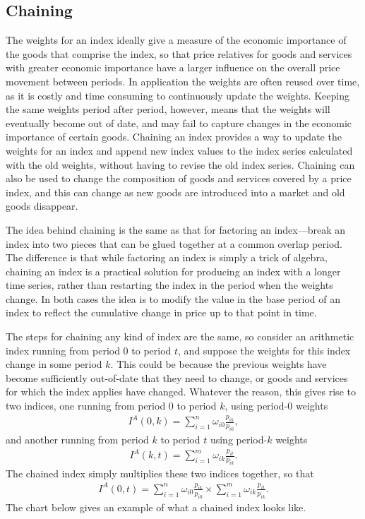 \documentclass[
]{article}
\begin{document}
\hypertarget{chaining}{%
\subsection{Chaining}\label{chaining}}

The weights for an index ideally give a measure of the economic importance of the goods that comprise the index, so that price relatives for goods and services with greater economic importance have a larger influence on the overall price movement between periods. In application the weights are often reused over time, as it is costly and time consuming to continuously update the weights. Keeping the same weights period after period, however, means that the weights will eventually become out of date, and may fail to capture changes in the economic importance of certain goods. Chaining an index provides a way to update the weights for an index and append new index values to the index series calculated with the old weights, without having to revise the old index series. Chaining can also be used to change the composition of goods and services covered by a price index, and this can change as new goods are introduced into a market and old goods disappear.

The idea behind chaining is the same as that for factoring an index---break an index into two pieces that can be glued together at a common overlap period. The difference is that while factoring an index is simply a trick of algebra, chaining an index is a practical solution for producing an index with a longer time series, rather than restarting the index in the period when the weights change. In both cases the idea is to modify the value in the base period of an index to reflect the cumulative change in price up to that point in time.

The steps for chaining any kind of index are the same, so consider an arithmetic index running from period 0 to period \(t\), and suppose the weights for this index change in some period \(k\). This could be because the previous weights have become sufficiently out-of-date that they need to change, or goods and services for which the index applies have changed. Whatever the reason, this gives rise to two indices, one running from period 0 to period \(k\), using period-0 weights
\begin{align*}
I^{A}(0, k) = \sum_{i = 1}^{n} \omega_{i0} \frac{p_{ik}}{p_{i0}},
\end{align*}
and another running from period \(k\) to period \(t\) using period-\(k\) weights
\begin{align*}
I^{A}(k, t) = \sum_{i = 1}^{m} \omega_{ik} \frac{p_{it}}{p_{ik}}.
\end{align*}
The chained index simply multiplies these two indices together, so that
\begin{align*}
I^{A}(0, t) = \sum_{i = 1}^{n} \omega_{i0} \frac{p_{ik}}{p_{i0}} \times \sum_{i = 1}^{m} \omega_{ik} \frac{p_{it}}{p_{ik}}.
\end{align*}
The chart below gives an example of what a chained index looks like.
\end{document}
